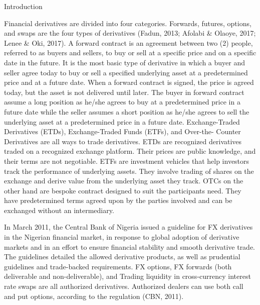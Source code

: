 \documentclass[unknownkeysallowed, compress]{beamer}
\theoremstyle{plain}
\begin{document}
\begin{frame}[allowframebreaks]{Introduction}
\par Financial derivatives are divided into four categories. Forwards, futures, options,
and swaps are the four types of derivatives (Fadun, 2013; Afolabi \& Olaoye, 2017; Lenee
\& Oki, 2017). A forward contract is an agreement between two (2) people, referred to as
buyers and sellers, to buy or sell at a specific price and on a specific date in the future. It
is the most basic type of derivative in which a buyer and seller agree today to buy or sell
a specified underlying asset at a predetermined price and at a future date. When a
forward contract is signed, the price is agreed today, but the asset is not delivered until
later. The buyer in forward contract assume a long position as he/she agrees to buy at a
predetermined price in a future date while the seller assumes a short position as he/she
agrees to sell the underlying asset at a predetermined price in a future date.
Exchange-Traded Derivatives (ETDs), Exchange-Traded Funds (ETFs), and Over-the-
Counter Derivatives are all ways to trade derivatives. ETDs are recognized derivatives
traded on a recognized exchange platform. Their prices are public knowledge, and their
terms are not negotiable. ETFs are investment vehicles that help investors track the
performance of underlying assets. They involve trading of shares on the exchange and
derive value from the underlying asset they track. OTCs on the other hand are bespoke
contract designed to suit the participants need. They have predetermined terms agreed
upon by the parties involved and can be exchanged without an intermediary.\\
\par In March 2011, the Central Bank of Nigeria issued a guideline for FX derivatives in
the Nigerian financial market, in response to global adoption of derivative markets and in
an effort to ensure financial stability and smooth derivative trade. The guidelines detailed
the allowed derivative products, as well as prudential guidelines and trade-backed
requirements. FX options, FX forwards (both deliverable and non-deliverable), and
Trading liquidity in cross-currency interest rate swaps are all authorized derivatives.
Authorized dealers can use both call and put options, according to the regulation (CBN, 2011).\\


\end{frame}
\end{document}
